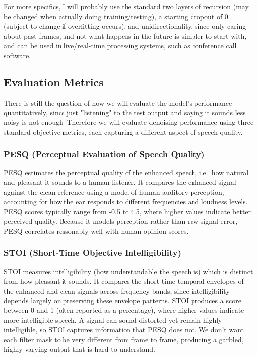 \documentclass[11pt, letterpaper]{article}
\begin{document}
For more specifics, I will probably use the standard two layers of recursion (may be changed when actually doing training/testing), a starting dropout of 0 (subject to change if overfitting occurs), and unidirectionality, since only caring about past frames, and not what happens in the future is simpler to start with, and can be used in live/real-time processing systems, such as conference call software. 

\subsection{Evaluation Metrics}

There is still the question of how we will evaluate the model's performance quantitatively, since just "listening" to the test output and saying it sounds less noisy is not enough. Therefore we will evaluate denoising performance using three standard objective metrics, each capturing a different aspect of speech quality.

\subsubsection{PESQ (Perceptual Evaluation of Speech Quality)}
PESQ estimates the perceptual quality of the enhanced speech,
i.e.\ how natural and pleasant it sounds to a human listener. It
compares the enhanced signal against the clean reference using a model
of human auditory perception, accounting for how the ear responds to
different frequencies and loudness levels. PESQ scores typically range
from -0.5 to 4.5, where higher values indicate better perceived
quality. Because it models perception rather than raw signal error,
PESQ correlates reasonably well with human opinion scores.

\subsubsection{STOI (Short-Time Objective Intelligibility)}
STOI measures intelligibility (how understandable the speech
is) which is distinct from how pleasant it sounds. It compares the
short-time temporal envelopes of the enhanced and clean signals across
frequency bands, since intelligibility depends largely on preserving
these envelope patterns. STOI produces a score between 0 and 1
(often reported as a percentage), where higher values indicate more
intelligible speech. A signal can sound distorted yet remain highly
intelligible, so STOI captures information that PESQ does not. We don't want each filter mask to be very different from frame to frame, producing a garbled, highly varying output that is hard to understand.
\end{document}
